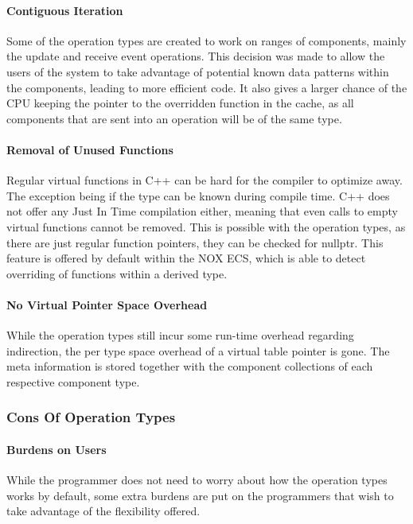 \paragraph{Contiguous Iteration}
Some of the operation types are created to work on ranges of components, mainly the update and receive event operations.
This decision was made to allow the users of the system to take advantage of potential known data patterns within the components, leading to more efficient code.
It also gives a larger chance of the CPU keeping the pointer to the overridden function in the cache, as all components that are sent into an operation will be of the same type.

\paragraph{Removal of Unused Functions}
Regular virtual functions in C++ can be hard for the compiler to optimize away. 
The exception being if the type can be known during compile time. 
C++ does not offer any Just In Time compilation either, meaning that even calls to empty virtual functions cannot be removed.
This is possible with the operation types, as there are just regular function pointers, they can be checked for nullptr.
This feature is offered by default within the NOX ECS, which is able to detect overriding of functions within a derived type.

\paragraph{No Virtual Pointer Space Overhead}
While the operation types still incur some run-time overhead regarding indirection, the per type space overhead of a virtual table pointer is gone.
The meta information is stored together with the component collections of each respective component type.

\subsubsection{Cons Of Operation Types}
\paragraph{Burdens on Users}
While the programmer does not need to worry about how the operation types works by default,
some extra burdens are put on the programmers that wish to take advantage of the flexibility offered.

